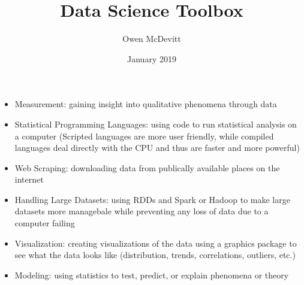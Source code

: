 \documentclass{article}
\title{Data Science Toolbox}
\author{Owen McDevitt}
\date{January 2019}
\begin{document}
\maketitle

\begin{itemize}
    \item Measurement: gaining insight into qualitative phenomena through data
    \item Statistical Programming Languages: using code to run statistical analysis on a computer (Scripted languages are more user friendly, while compiled languages deal directly with the CPU and thus are faster and more powerful)
    \item Web Scraping: downloading data from publically available places on the internet
    \item Handling Large Datasets: using RDDs and Spark or Hadoop to make large datasets more managebale while preventing any loss of data due to a computer failing 
    \item Visualization: creating visualizations of the data using a graphics package to see what the data looks like (distribution, trends, correlations, outliers, etc.)
    \item Modeling: using statistics to test, predict, or explain phenomena or theory
\end{itemize}
\end{document}
